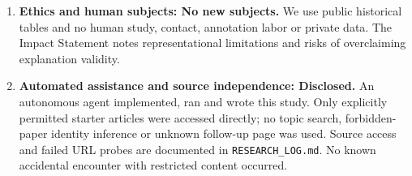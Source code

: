 \begin{enumerate}
\item \textbf{Ethics and human subjects: No new subjects.} We use public historical tables and no human study, contact, annotation labor or private data. The Impact Statement notes representational limitations and risks of overclaiming explanation validity.
\item \textbf{Automated assistance and source independence: Disclosed.} An autonomous agent implemented, ran and wrote this study. Only explicitly permitted starter articles were accessed directly; no topic search, forbidden-paper identity inference or unknown follow-up page was used. Source access and failed URL probes are documented in \texttt{RESEARCH\_LOG.md}. No known accidental encounter with restricted content occurred.
\end{enumerate}
